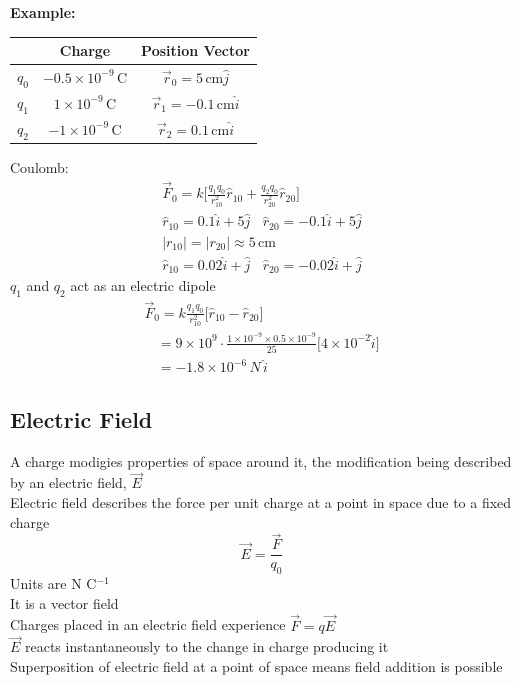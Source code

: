 \documentclass[a4paper, 11pt, fleqn, normalem]{report}
\begin{document}
\textbf{Example: }
\begin{table}[H]
    \begin{tabular}{|c|c|c|}
    \hline
    \rowcolor{lightgray} & Charge & Position Vector \\
    \hline
    $q_{0}$ & $-0.5\times10^{-9}$\,C & $\vec{r}_{0} = 5\,\text{cm}\hat{j}$\\
    \hline
    $q_{1}$ & $1\times10^{-9}$\,C & $\vec{r}_{1} = -0.1\,\text{cm}\hat{i}$\\
    \hline
    $q_{2}$ & $-1\times10^{-9}$\,C & $\vec{r}_{2} = 0.1\,\text{cm}\hat{i}$\\
    \hline
    \end{tabular}
\end{table}
Coulomb:
\begin{gather*}
    \vec{F}_{0} = k\Bigg[\frac{q_{1}q_{0}}{r_{10}^{2}}\hat{r}_{10} + \frac{q_{2}q_{0}}{r_{20}^{2}}\hat{r}_{20}\Bigg] \\
    \hat{r}_{10} = 0.1\hat{i} + 5\hat{j} ~~~~ \hat{r}_{20} = -0.1\hat{i} + 5\hat{j} \\
    |r_{10}| = |r_{20}| \approx 5\,\text{cm} \\
    \hat{r}_{10} = 0.02\hat{i} + \hat{j} ~~~~ \hat{r}_{20} = -0.02\hat{i} + \hat{j}
\end{gather*}
$q_{1}$ and $q_{2}$ act as an electric dipole
\begin{gather*}
    \vec{F}_{0} = k\frac{q_{1}q_{0}}{r_{10}^{2}}\Big[\hat{r}_{10} - \hat{r}_{20}\Big] \\
    ~~~~ = 9\times10^{9} \cdot \frac{1\times10^{-9}\times0.5\times10^{-9}}{25}\Big[4\times10^{-2}\hat{i}\Big] \\
    ~~~~ = -1.8\times10^{-6}\,N\,\hat{i}
\end{gather*}

\section{Electric Field}
A charge modigies properties of space around it, the modification being described by an electric field, $\vec{E}$ \\
Electric field describes the force per unit charge at a point in space due to a fixed charge
\begin{equation*}
    \vec{E} = \frac{\vec{F}}{q_{0}}
\end{equation*}
Units are N C$^{-1}$ \\
It is a vector field \\
Charges placed in an electric field experience $\vec{F} = q\vec{E}$ \\
$\vec{E}$ reacts instantaneously to the change in charge producing it \\
Superposition of electric field at a point of space means field addition is possible

\chapter{}
\end{document}
